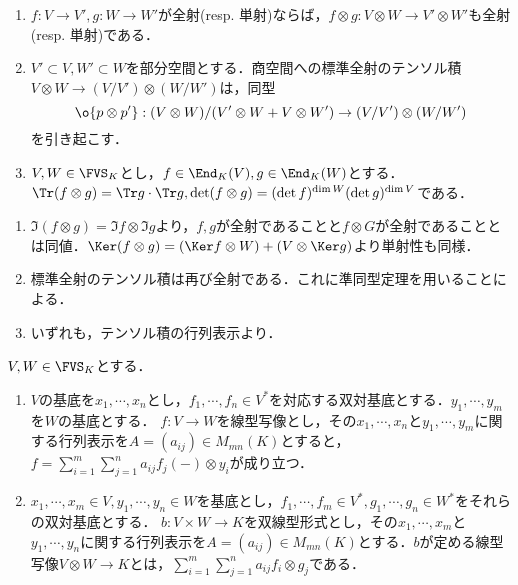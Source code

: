 \documentclass[uplatex, dvipdfmx]{jsreport}
\begin{document}
\begin{corollary}[単射・全射性の保存]\label{cor-tensor-product-of-linear-maps}\mbox{}
    \begin{enumerate}
        \item $f:V\to V',g:W\to W'$が全射(resp. 単射)ならば，$f\otimes g:V\otimes W\to V'\otimes W'$も全射(resp. 単射)である．
        \item $V'\subset V,W'\subset W$を部分空間とする．商空間への標準全射のテンソル積$V\otimes W\to(V/V')\otimes(W/W')$は，同型\[\o{p\otimes p'}:(V\otimes W)/(V'\otimes W+V\otimes W')\to (V/V')\otimes(W/W')\]を引き起こす．
        \item $V,W\in\FVS_K$とし，$f\in\End_K(V),g\in\End_K(W)$とする．$\Tr(f\otimes g)=\Tr g\cdot\Tr g,\det(f\otimes g)=(\det f)^{\dim W}(\det g)^{\dim V}$である．
    \end{enumerate}
\end{corollary}
\begin{Proof}\mbox{}
    \begin{enumerate}
        \item $\Im(f\otimes g)=\Im f\otimes\Im g$より，$f,g$が全射であることと$f\otimes G$が全射であることとは同値．$\Ker(f\otimes g)=(\Ker f\otimes W)+(V\otimes\Ker g)$より単射性も同様．
        \item 標準全射のテンソル積は再び全射である．これに準同型定理を用いることによる．
        \item いずれも，テンソル積の行列表示より．
    \end{enumerate}
\end{Proof}

\begin{example}[線型写像の空間の基底]
    $V,W\in\FVS_K$とする．
    \begin{enumerate}
        \item $V$の基底を$x_1,\cdots,x_n$とし，$f_1,\cdots,f_n\in V^*$を対応する双対基底とする．$y_1,\cdots,y_m$を$W$の基底とする．
        $f:V\to W$を線型写像とし，その$x_1,\cdots,x_n$と$y_1,\cdots,y_m$に関する行列表示を$A=(a_{ij})\in M_{mn}(K)$とすると，$f=\sum^m_{i=1}\sum^n_{j=1}a_{ij}f_j(-)\otimes y_i$が成り立つ．
        \item 
        $x_1,\cdots,x_m\in V,y_1,\cdots,y_n\in W$を基底とし，$f_1,\cdots,f_m\in V^*,g_1,\cdots,g_n\in W^*$をそれらの双対基底とする．
        $b:V\times W\to K$を双線型形式とし，その$x_1,\cdots,x_m$と$y_1,\cdots,y_n$に関する行列表示を$A=(a_{ij})\in M_{mn}(K)$とする．$b$が定める線型写像$V\otimes W\to K$とは，$\sum^m_{i=1}\sum^n_{j=1}a_{ij}f_i\otimes g_j$である．
    \end{enumerate}
\end{example}
\end{document}
